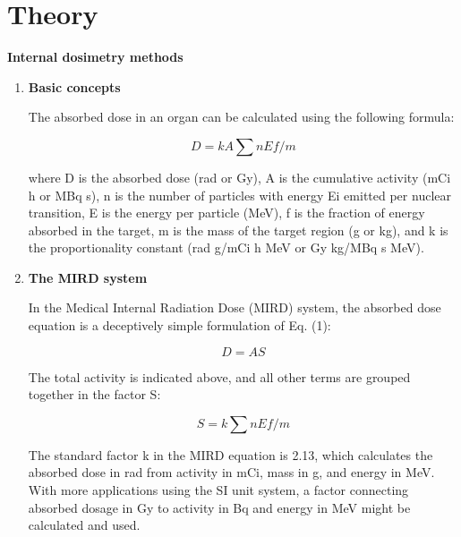\documentclass[12pt]{article}
\begin{document}
\section{Theory}
\textbf{Internal dosimetry methods}
\begin{enumerate}
 \item  \textbf{Basic concepts} \par The absorbed dose in an organ can be calculated using the following formula: \par
	\begin{equation}
	D = {kA\sum nEf/m} 
	\end{equation}
	\par where D is the absorbed dose (rad or Gy), A is the cumulative activity (mCi h or MBq s), n is the number of particles with energy Ei emitted per nuclear 			transition, E is the energy per particle (MeV), f is the fraction of energy absorbed in the target, m is the mass of the target region (g or kg), and k is 				the proportionality constant (rad g/mCi h MeV or Gy kg/MBq s MeV).
 \item  \textbf{The MIRD system} \par In the Medical Internal Radiation Dose (MIRD) system, the absorbed dose equation is a deceptively simple formulation of Eq. (1): \par
	\begin{equation}
	D = AS
	\end{equation} \par
The total activity is indicated above, and all other terms are grouped together in the factor S: \par
	\begin{equation}
	S = {k\sum nEf/m} 
	\end{equation} \par
The standard factor k in the MIRD equation is 2.13, which calculates the absorbed dose in rad from activity in mCi, mass in g, and energy in MeV. With more applications using the SI unit system, a factor connecting absorbed dosage in Gy to activity in Bq and energy in MeV might be calculated and used.

\end{enumerate}
\end{document}
